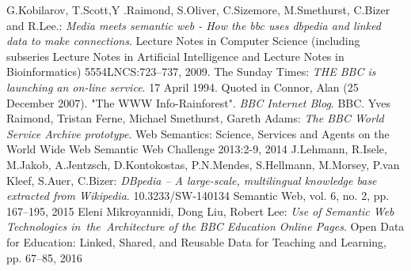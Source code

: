 \documentclass{llncs}
\begin{document}
%
%
\begin{thebibliography}{5}
%
  G.Kobilarov, T.Scott,Y .Raimond, S.Oliver, C.Sizemore, M.Smethurst, C.Bizer and R.Lee.:
  \textit{Media meets semantic web - How the bbc uses dbpedia and linked data to make connections}.
  Lecture Notes in Computer Science (including subseries Lecture Notes in Artiﬁcial Intelligence and Lecture Notes in Bioinformatics)
  5554LNCS:723–737, 2009.
%
  The Sunday Times:
  \textit{THE BBC is launching an on-line service}. 17 April 1994.
  Quoted in Connor, Alan (25 December 2007). "The WWW Info-Rainforest". \textit{BBC Internet Blog}. BBC.
%
  Yves Raimond, Tristan Ferne, Michael Smethurst, Gareth Adams:
  \textit{The BBC World Service Archive prototype}.
  Web Semantics: Science, Services and Agents on the World Wide Web
  Semantic Web Challenge 2013:2-9, 2014
%
  J.Lehmann, R.Isele, M.Jakob, A.Jentzsch, D.Kontokostas, P.N.Mendes, S.Hellmann, M.Morsey, P.van Kleef, S.Auer, C.Bizer:
  \textit{DBpedia – A large-scale, multilingual knowledge base extracted from Wikipedia}.
  10.3233/SW-140134
  Semantic Web, vol. 6, no. 2, pp. 167--195, 2015
%
  Eleni Mikroyannidi, Dong Liu, Robert Lee:
  \textit{Use of Semantic Web Technologies in the Architecture of the BBC Education Online Pages}.
  Open Data for Education: Linked, Shared, and Reusable Data for Teaching and Learning, pp. 67--85, 2016
%
\end{thebibliography}
\end{document}
